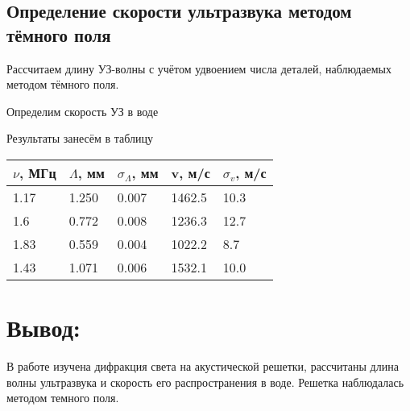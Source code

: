 \documentclass[a4paper, 12pt]{article}
\begin{document}
\subsection{Определение скорости ультразвука методом тёмного поля}
\par
Рассчитаем длину УЗ-волны с учётом удвоением числа деталей, наблюдаемых методом тёмного поля.
\par
Определим скорость УЗ в воде
\par
Результаты занесём в таблицу
\begin{table}[h]
\begin{tabular}{|l|l|l|l|l|}
\hline
$\nu$, МГц & $\Lambda$, мм & $\sigma_{\Lambda}$, мм & v, м/с & $\sigma_{v}$, м/с \\ \hline
1.17       & 1.250        & 0.007                 & 1462.5 & 10.3              \\ \hline
1.6        & 0.772        & 0.008                 & 1236.3 & 12.7              \\ \hline
1.83       & 0.559        & 0.004                 & 1022.2 & 8.7               \\ \hline
1.43       & 1.071        & 0.006                 & 1532.1 & 10.0              \\ \hline
\end{tabular}
\end{table}





\large\section{Вывод:}
В работе изучена дифракция света на акустической решетки, рассчитаны длина волны ультразвука и скорость его распространения в воде. Решетка наблюдалась методом
темного поля.
\end{document}
